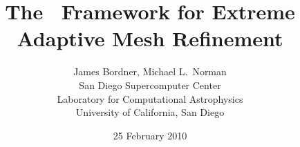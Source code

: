 \documentclass[11pt,letterpaper]{article}
\begin{document}






\title{The \cello\ Framework for Extreme Adaptive Mesh Refinement}
\author{James Bordner, Michael L.~Norman \\
        San Diego Supercomputer Center \\
        Laboratory for Computational Astrophysics\\
        University of California, San Diego}
\date{25 February 2010}
\maketitle

%
%
%
\end{document}
